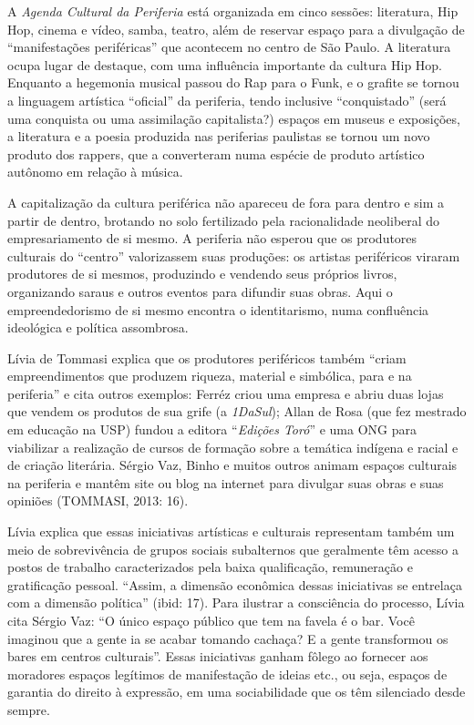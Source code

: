 A \emph{Agenda Cultural da Periferia} está organizada em cinco sessões:
literatura, Hip Hop, cinema e vídeo, samba, teatro, além de reservar
espaço para a divulgação de ``manifestações periféricas'' que acontecem
no centro de São Paulo. A literatura ocupa lugar de destaque, com uma
influência importante da cultura Hip Hop. Enquanto a hegemonia musical
passou do Rap para o Funk, e o grafite se tornou a linguagem artística
``oficial'' da periferia, tendo inclusive ``conquistado'' (será uma
conquista ou uma assimilação capitalista?) espaços em museus e
exposições, a literatura e a poesia produzida nas periferias paulistas
se tornou um novo produto dos rappers, que a converteram numa espécie de
produto artístico autônomo em relação à música.

A capitalização da cultura periférica não apareceu de fora para dentro e
sim a partir de dentro, brotando no solo fertilizado pela racionalidade
neoliberal do empresariamento de si mesmo. A periferia não esperou que
os produtores culturais do ``centro'' valorizassem suas produções: os
artistas periféricos viraram produtores de si mesmos, produzindo e
vendendo seus próprios livros, organizando saraus e outros eventos para
difundir suas obras. Aqui o empreendedorismo de si mesmo encontra o
identitarismo, numa confluência ideológica e política assombrosa.

Lívia de Tommasi explica que os produtores periféricos também ``criam
empreendimentos que produzem riqueza, material e simbólica, para e na
periferia'' e cita outros exemplos: Ferréz criou uma empresa e abriu
duas lojas que vendem os produtos de sua grife (a \emph{1DaSul}); Allan
de Rosa (que fez mestrado em educação na USP) fundou a editora
``\emph{Edições Toró}'' e uma ONG para viabilizar a realização de cursos
de formação sobre a temática indígena e racial e de criação literária.
Sérgio Vaz, Binho e muitos outros animam espaços culturais na periferia
e mantêm site ou blog na internet para divulgar suas obras e suas
opiniões (TOMMASI, 2013: 16).

Lívia explica que essas iniciativas artísticas e culturais representam
também um meio de sobrevivência de grupos sociais subalternos que
geralmente têm acesso a postos de trabalho caracterizados pela baixa
qualificação, remuneração e gratificação pessoal. ``Assim, a dimensão
econômica dessas iniciativas se entrelaça com a dimensão política''
(ibid: 17). Para ilustrar a consciência do processo, Lívia cita Sérgio
Vaz: ``O único espaço público que tem na favela é o bar. Você imaginou
que a gente ia se acabar tomando cachaça? E a gente transformou os bares
em centros culturais''. Essas iniciativas ganham fôlego ao fornecer aos
moradores espaços legítimos de manifestação de ideias etc., ou seja,
espaços de garantia do direito à expressão, em uma sociabilidade que os
têm silenciado desde sempre.

